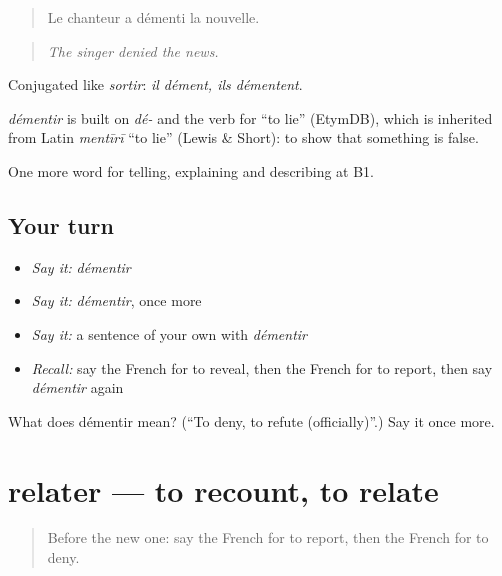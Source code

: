 \begin{quote}
Le chanteur a démenti la nouvelle.
\end{quote}

\begin{quote}
\emph{The singer denied the news.}
\end{quote}

Conjugated like \emph{sortir}: \emph{il dément, ils démentent}.

\begin{cousinweb}
\emph{démentir} is built on \emph{dé-} and the verb for \textquotedblleft{}to lie\textquotedblright{} (EtymDB), which is inherited from Latin \emph{mentīrī} \textquotedblleft{}to lie\textquotedblright{} (Lewis \& Short): to show that something is false.
\end{cousinweb}

\begin{grammarlens}[title={What you've built}]
One more word for telling, explaining and describing at B1.
\end{grammarlens}

\subsection*{Your turn}
\begin{itemize}
\raggedright
  \item \emph{Say it:} \emph{démentir}
  \item \emph{Say it:} \emph{démentir}, once more
  \item \emph{Say it:} a sentence of your own with \emph{démentir}
  \item \emph{Recall:} say the French for to reveal, then the French for to report, then say \emph{démentir} again
\end{itemize}

\begin{tcolorbox}[breakable,colback=teal!4,colframe=teal!35!black,title={Before you move on}]
What does démentir mean? (\textquotedblleft{}To deny, to refute (officially)\textquotedblright{}.) Say it once more.
\end{tcolorbox}
\section[relater]{relater — to recount, to relate}

\label{lesson:FR-C284-relater}



\begin{quote}
Before the new one: say the French for to report, then the French for to deny.
\end{quote}

